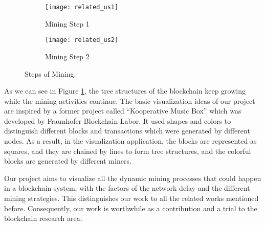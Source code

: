 \begin{figure}[htb]
    \centering
    \begin{subfigure}[b]{1\textwidth}
        \centering
        \texttt{[image: related\_us1]}
        \caption{Mining Step 1}
    \end{subfigure}

    \begin{subfigure}[b]{1\textwidth}
        \centering
        \texttt{[image: related\_us2]}
        \caption{Mining Step 2}
    \end{subfigure}

    \caption{Steps of Mining.}
    \label{fig:steps of mining}
\end{figure}

As we can see in Figure \ref{fig:steps of mining}, the tree structures of the blockchain keep growing while the mining activities continue. The basic visualization ideas of our project are inspired by a former project called “Kooperative Music Box” \cite{musicbox} which was developed by Fraunhofer Blockchain-Labor. It used shapes and colors to distinguish different blocks and transactions which were generated by different nodes. As a result, in the visualization application, the blocks are represented as squares, and they are chained by lines to form tree structures, and the colorful blocks are generated by different miners.

Our project aims to visualize all the dynamic mining processes that could happen in a blockchain system, with the factors of the network delay and the different mining strategies. This distinguishes our work to all the related works mentioned before. Consequently, our work is worthwhile as a contribution and a trial to the blockchain research area.
